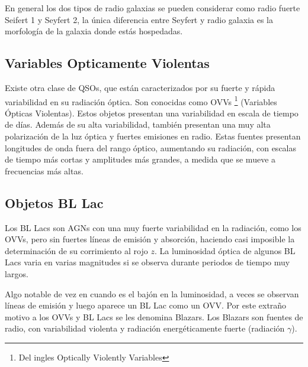 En general los dos tipos de radio galaxias se pueden considerar como radio fuerte Seifert 1 y Seyfert 2, la única diferencia entre Seyfert y radio galaxia es la morfología de la galaxia donde estás hospedadas. 

	\subsection{Variables Opticamente Violentas}
	\label{subsec:Optically_Violently_Variables}

Existe otra clase de QSOs, que están caracterizados por su fuerte y rápida variabilidad en su radiación óptica. Son conocidas como OVVs \footnote{Del ingles Optically Violently Variables } (Variables Ópticas Violentas). Estos objetos presentan una variabilidad en escala de tiempo de días. Además de su alta variabilidad, también presentan una muy alta polarización de la luz óptica y fuertes emisiones en radio. Estas fuentes presentan longitudes de onda fuera del rango óptico, aumentando su radiación, con escalas de tiempo más cortas y amplitudes más grandes, a medida que se mueve a frecuencias más altas.  

	\subsection{Objetos BL Lac}
	\label{subsec:BL_Lac}

Los BL Lacs son AGNs con una muy fuerte variabilidad en la radiación, como los OVVs, pero sin fuertes líneas de emisión y absorción, haciendo casi imposible la determinación de su corrimiento al rojo $z$. La luminosidad óptica de algunos BL Lacs varia en varias magnitudes si se observa durante periodos de tiempo muy largos.

Algo notable de vez en cuando es el bajón en la luminosidad, a veces se observan líneas de emisión y luego aparece un BL Lac como un OVV. Por este extraño motivo a los OVVs y BL Lacs se les denomina Blazars. Los Blazars son fuentes de radio, con variabilidad violenta y radiación energéticamente fuerte (radiación $\gamma$).


